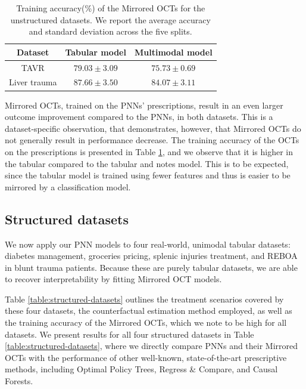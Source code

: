 \documentclass[10pt]{article} %
\begin{document}
\begin{table}[ht]
    \caption{Training accuracy(\%) of the Mirrored OCTs for the unstructured datasets. We report the average accuracy and standard deviation across the five splits. }
    \begin{center}
    \begin{tabular}{ccc}
         \textbf{Dataset} & \textbf{Tabular model} & \textbf{Multimodal model}\\ \midrule
         TAVR & $79.03\pm 3.09 $& $75.73\pm 0.69$\\
         Liver trauma & $87.66\pm 3.50$ & $84.07\pm 3.11$ \\
    \end{tabular}
    \label{tab:accuracy_octs_unstr}
    \end{center}
\end{table}


Mirrored OCTs, trained on the PNNs' prescriptions, result in an even larger outcome improvement compared to the PNNs, in both datasets. This is a dataset-specific observation, that demonstrates, however, that Mirrored OCTs do not generally result in performance decrease. The training accuracy of the OCTs on the prescriptions is presented in Table \ref{tab:accuracy_octs_unstr}, and we observe that it is higher in the tabular compared to the tabular and notes model. This is to be expected, since the tabular model is trained using fewer features and thus is easier to be mirrored by a classification model. 


\subsection{Structured datasets} \label{res:structured}
We now apply our PNN models to four real-world, unimodal tabular datasets: diabetes management, groceries pricing, splenic injuries treatment, and REBOA in blunt trauma patients. Because these are purely tabular datasets, we are able to recover interpretability by fitting Mirrored OCT models. 

Table \ref{table:structured-datasets} outlines the treatment scenarios covered by these four datasets, the counterfactual estimation method employed, as well as the training accuracy of the Mirrored OCTs, which we note to be high for all datasets. We present results for all four structured datasets in Table \ref{table:structured-datasets}, where we directly compare PNNs and their Mirrored OCTs with the performance of other well-known, state-of-the-art prescriptive methods, including Optimal Policy Trees, Regress \& Compare, and Causal Forests. 
\end{document}
